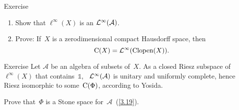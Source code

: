 \documentclass[main.tex]{subfiles}
\begin{document}
%
%
\begin{psec}{6.8}{Exercise}
\begin{enumerate}
\item\label{6.8-1}
Show that $\ell^\infty(X)$ is an $\mathcal{L}^\infty(\mathcal A)$.
%
\item\label{6.8-2}
Prove:
If~$X$ is a zerodimensional compact Hausdorff space,
then
\begin{equation*}
\mathrm{C}(X)=\mathcal{L}^\infty(\mathrm{Clopen}(X))\text{.}
\end{equation*}
\end{enumerate}
\end{psec}
%
%
\begin{psec}{6.9}{Exercise}
Let $\mathcal A$ be an algebra of subsets of~$X$.
As a closed Riesz subspace of~$\ell^\infty(X)$
that contains~$\mathbb 1$, \ 
$\mathcal{L}^\infty(\mathcal A)$ is unitary and uniformly complete,
hence Riesz isomorphic to some~$\mathrm{C}(\Phi)$,
according to Yosida.

Prove that~$\Phi$ is a Stone space for~$\mathcal A$~(\ref{3.19}).
\end{psec}
\clearpage
\end{document}
